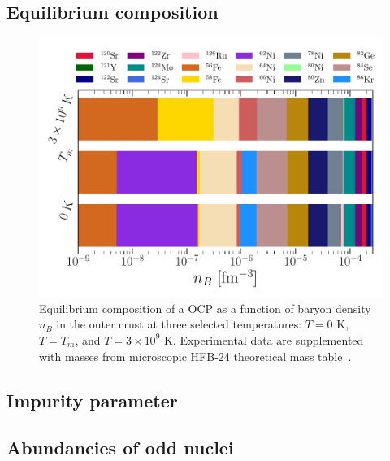 \subsection{Equilibrium composition}\label{subsec:compo_ocrust_tm}


\begin{figure}[!t]
  \begin{center}
    \includegraphics[width=\linewidth]{figures/ocrust_compo_vs_temp.pdf}
  \end{center}
  \caption[Equilibrium OCP composition versus baryon density in the outer crust 
  at finite temperature]{Equilibrium composition of a OCP as a function of 
    baryon density $n_B$ in the outer crust at three selected temperatures: 
  $T=0$ K, $T=T_m$, and $T=3\times 10^9$ K. 
  Experimental data are supplemented with masses from microscopic HFB-24 
  theoretical mass table~\cite{Goriely2013}.}\label{fig:ocrust_compo_vs_temp}
\end{figure}

\subsection{Impurity parameter}\label{subsec:qimp_ocrust}

\subsection{Abundancies of odd nuclei}\label{subsec:odd_ocrust}

